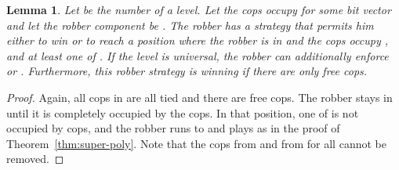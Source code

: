 \documentclass[authoryear]{article}
\newtheorem{lemma}[theorem]{Lemma}
\theoremstyle{definition}
\newcommand{\0}{\emptyset}
\begin{document}
\begin{lemma}\label{lemma:robber_invariant}
  Let  be the number of a level.  Let the cops occupy
   for some bit vector  and let the robber component be
  . The robber has a strategy that permits him either to win or
  to reach a position where the robber is in  and the cops
  occupy ,  and at least one of . If the level is
  universal, the robber can additionally enforce  or . Furthermore,
  this robber strategy is winning if there are only  free cops.
\end{lemma}
\begin{proof}
  Again, all cops in  are all tied and there are  free cops.
  The robber stays in  until it is completely occupied by the cops. In
  that position, one of  is not occupied by cops, and the robber runs
  to  and plays as in the proof of
  Theorem~\ref{thm:super-poly}. Note that the cops from  and from
   for all  cannot be removed.
\end{proof}
\end{document}
